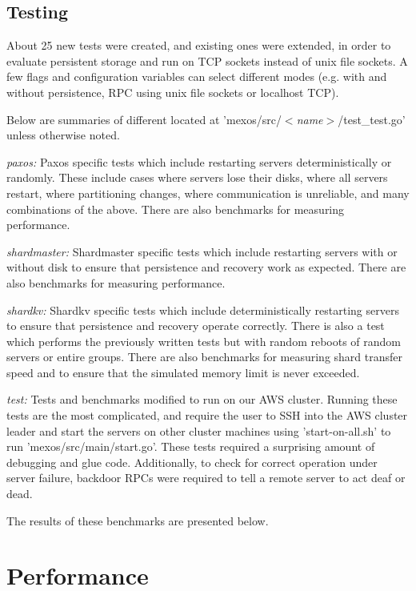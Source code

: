 \documentclass[letterpaper,10pt]{article}
\begin{document}
\begin{itemize}
\subsection{Testing}
About 25 new tests were created, and existing ones were extended, in order to evaluate persistent storage and run on TCP sockets instead of unix file sockets.  A few flags and configuration variables can select different modes (e.g. with and without persistence, RPC using unix file sockets or localhost TCP).

Below are summaries of different located at 'mexos/src/\emph{$<$name$>$}/test\_test.go' unless otherwise noted.

\emph{paxos:} Paxos specific tests which include restarting servers deterministically or randomly.  These include cases where servers lose their disks, where all servers restart, where partitioning changes, where communication is unreliable, and many combinations of the above.  There are also benchmarks for measuring performance.

\emph{shardmaster:} Shardmaster specific tests which include restarting servers with or without disk to ensure that persistence and recovery work as expected.  There are also benchmarks for measuring performance.

\emph{shardkv:} Shardkv specific tests which include deterministically restarting servers to ensure that persistence and recovery operate correctly.  There is also a test which performs the previously written tests but with random reboots of random servers or entire groups.  There are also benchmarks for measuring shard transfer speed and to ensure that the simulated memory limit is never exceeded.

\emph{test:} Tests and benchmarks modified to run on our AWS cluster.  Running these tests are the most complicated, and require the user to SSH into the AWS cluster leader and start the servers on other cluster machines using 'start-on-all.sh' to run 'mexos/src/main/start.go'. These tests required a surprising amount of debugging and glue code.  Additionally, to check for correct operation under server failure, backdoor RPCs were required to tell a remote server to act deaf or dead.

The results of these benchmarks are presented below.

\section{Performance}


\end{itemize}
\end{document}
